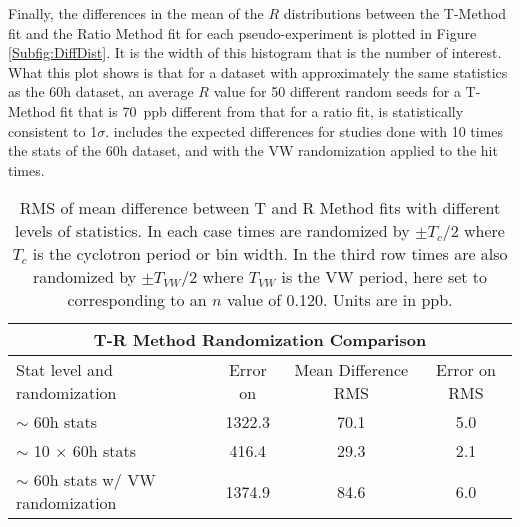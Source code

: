 
Finally, the differences in the mean of the $R$ distributions between the T-Method fit and the Ratio Method fit for each pseudo-experiment is plotted in Figure \ref{Subfig:DiffDist}. It is the width of this histogram that is the number of interest. What this plot shows is that for a dataset with approximately the same statistics as the 60h dataset, an average $R$ value for 50 different random seeds for a T-Method fit that is \SI{70}{ppb} different from that for a ratio fit, is statistically consistent to 1$\sigma$.  includes the expected differences for studies done with 10 times the stats of the 60h dataset, and with the VW randomization applied to the hit times.




\begin{table}
\centering
\small
\renewcommand{\arraystretch}{1.2}
\begin{tabular*}{1\linewidth}{@{\extracolsep{\fill}}lccc}
  \hline
    \multicolumn{4}{c}{\textbf{T-R Method Randomization Comparison}} \\
  \hline\hline
    Stat level and randomization & Error on \R & Mean Difference RMS & Error on RMS \\
  \hline
    $\sim$ 60h stats & 1322.3 & 70.1 & 5.0 \\
    $\sim$ 10 $\times$ 60h stats & 416.4 & 29.3 & 2.1 \\
    $\sim$ 60h stats w/ VW randomization & 1374.9 & 84.6 & 6.0 \\
  \hline
\end{tabular*}
\caption[T-R Method randomization comparison]{RMS of mean difference between T and R Method fits with different levels of statistics. In each case times are randomized by $\pm T_{c}/2$ where $T_{c}$ is the cyclotron period or bin width. In the third row times are also randomized by $\pm T_{VW}/2$ where $T_{VW}$ is the VW period, here set to  corresponding to an $n$ value of 0.120. Units are in ppb.}
\label{tab:TRRandomizationComparison}
\end{table}



